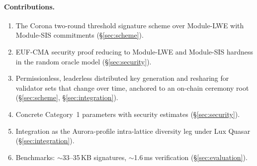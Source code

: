 \paragraph{Contributions.}
\begin{enumerate}[nosep]
\item The Corona two-round threshold signature scheme over Module-LWE with Module-SIS commitments (\S\ref{sec:scheme}).
\item EUF-CMA security proof reducing to Module-LWE and Module-SIS hardness in the random oracle model (\S\ref{sec:security}).
\item Permissionless, leaderless distributed key generation and resharing for validator sets that change over time, anchored to an on-chain ceremony root (\S\ref{sec:scheme}, \S\ref{sec:integration}).
\item Concrete Category~1 parameters with security estimates (\S\ref{sec:security}).
\item Integration as the Aurora-profile intra-lattice diversity leg under Lux Quasar (\S\ref{sec:integration}).
\item Benchmarks: $\sim$33--35\,KB signatures, $\sim$1.6\,ms verification (\S\ref{sec:evaluation}).
\end{enumerate}


